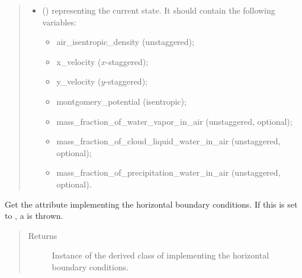 \documentclass[letterpaper,10pt,english]{sphinxmanual}
\begin{document}
\begin{fulllineitems}
\begin{fulllineitems}
\begin{quote}
\begin{description}
\begin{itemize}
\item {} 
 () \textendash{} 
 representing the current state.
It should contain the following variables:
\begin{itemize}
\item {} 
air\_isentropic\_density (unstaggered);

\item {} 
x\_velocity (\(x\)-staggered);

\item {} 
y\_velocity (\(y\)-staggered);

\item {} 
montgomery\_potential (isentropic);

\item {} 
mass\_fraction\_of\_water\_vapor\_in\_air (unstaggered, optional);

\item {} 
mass\_fraction\_of\_cloud\_liquid\_water\_in\_air (unstaggered, optional);

\item {} 
mass\_fraction\_of\_precipitation\_water\_in\_air (unstaggered, optional).

\end{itemize}


\end{itemize}

\end{description}\end{quote}

\end{fulllineitems}


\begin{fulllineitems}
\label{\detokenize{api:dycore.prognostic_isentropic_nonconservative.PrognosticIsentropicNonconservative.boundary}}
Get the attribute implementing the horizontal boundary conditions.
If this is set to , a  is thrown.
\begin{quote}\begin{description}
\item[{Returns}] \leavevmode
Instance of the derived class of {\hyperref[\detokenize{api:dycore.horizontal_boundary.HorizontalBoundary}]{}} implementing
the horizontal boundary conditions.


\end{description}
\end{quote}
\end{fulllineitems}
\end{fulllineitems}
\end{document}
